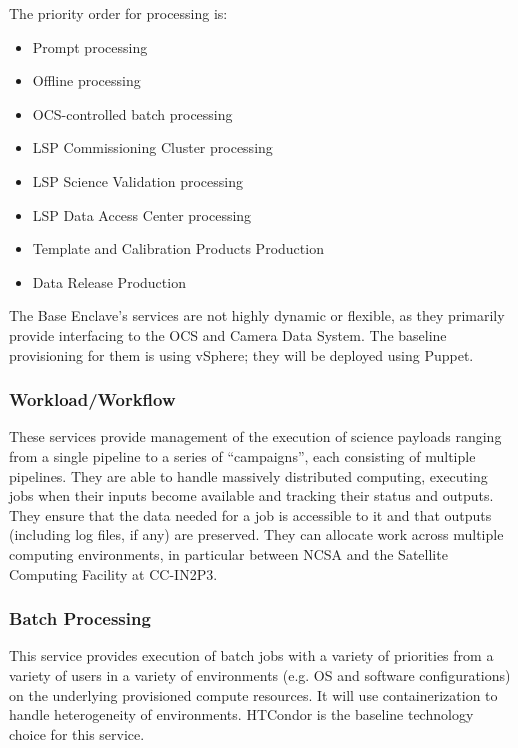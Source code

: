 \documentclass[DM,toc]{lsstdoc}
\begin{document}
The priority order for processing is:
\begin{itemize}
\item
  Prompt processing
\item
  Offline processing
\item
  OCS-controlled batch processing
\item
  LSP Commissioning Cluster processing
\item
  LSP Science Validation processing
\item
  LSP Data Access Center processing
\item
  Template and Calibration Products Production
\item
  Data Release Production
\end{itemize}

The Base Enclave's services are not highly dynamic or flexible, as they
primarily provide interfacing to the OCS and Camera Data System. The
baseline provisioning for them is using vSphere; they will be deployed
using Puppet.

\subsubsection{Workload/Workflow}\label{workloadworkflow}

These services provide management of the execution of science payloads
ranging from a single pipeline to a series of ``campaigns'', each
consisting of multiple pipelines. They are able to handle massively
distributed computing, executing jobs when their inputs become available
and tracking their status and outputs. They ensure that the data needed
for a job is accessible to it and that outputs (including log files, if
any) are preserved. They can allocate work across multiple computing
environments, in particular between NCSA and the Satellite Computing
Facility at CC-IN2P3.

\subsubsection{Batch Processing}\label{batch-processing}

This service provides execution of batch jobs with a variety of
priorities from a variety of users in a variety of environments (e.g. OS
and software configurations) on the underlying provisioned compute
resources. It will use containerization to handle heterogeneity of
environments. HTCondor is the baseline technology choice for this
service.
\end{document}

